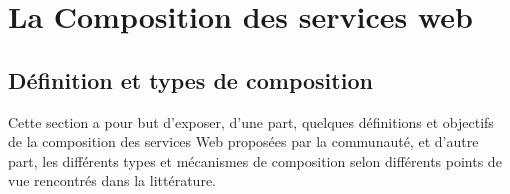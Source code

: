 \chapter{La Composition des services web}



  

  

\newpage

  \section{Définition et types de composition}
  \label{sec:defin-et-caract}

  Cette section a pour but d'exposer, d'une part, quelques définitions
  et objectifs de la composition des services Web proposées par la
  communauté, et d'autre part, les différents types et mécanismes de
  composition selon différents points de vue rencontrés dans la
  littérature.
  
